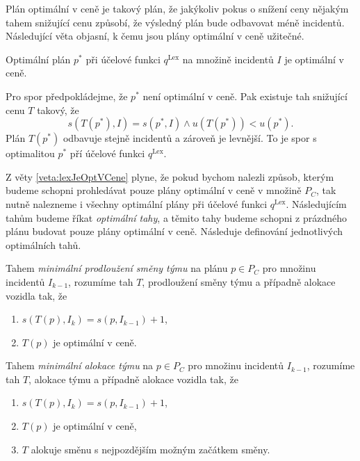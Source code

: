 Plán optimální v ceně je takový plán, že jakýkoliv pokus o snížení ceny nějakým tahem snižující cenu způsobí, že výsledný plán bude odbavovat méně incidentů.
Následující věta objasní, k čemu jsou plány optimální v ceně užitečné.
\begin{veta}\label{veta:lexJeOptVCene}
  Optimální plán $p^*$ při účelové funkci $q^{\text{Lex}}$ na množině incidentů $I$ je optimální v ceně.
\end{veta}
\begin{dukaz}
  Pro spor předpokládejme, že $p^*$ není optimální v ceně.
  Pak existuje tah snižující cenu $T$ takový, že
  \begin{equation*}
    s(T(p^*), I) = s(p^*, I) \land u(T(p^*)) < u(p^*).
  \end{equation*}
  Plán $T(p^*)$ odbavuje stejně incidentů a zároveň je levnější.
  To je spor s optimalitou $p^*$ pří účelové funkci $q^{\text{Lex}}$.
\end{dukaz}

Z věty \ref{veta:lexJeOptVCene} plyne, že pokud bychom nalezli způsob, kterým budeme schopni prohledávat pouze plány optimální v ceně v množině $P_C$, tak nutně
nalezneme i všechny optimální plány při účelové funkci $q^{\text{Lex}}$.
Následujícím tahům budeme říkat \textit{optimální tahy}, a těmito tahy budeme schopni z prázdného plánu budovat pouze plány optimální v ceně.
Následuje definování jednotlivých optimálních tahů.

\begin{definice}
  Tahem \textit{minimální prodloužení směny týmu} na plánu $p \in P_C$ pro množinu incidentů $I_{k-1}$, rozumíme tah $T$, prodloužení směny týmu a případně alokace vozidla tak, že
  \begin{enumerate}
    \item
      $s(T(p), I_{k}) = s(p, I_{k-1}) + 1$,
    \item
      $T(p)$ je optimální v ceně.
  \end{enumerate}
\end{definice}

\begin{definice}
  Tahem \textit{minimální alokace týmu} na $p \in P_C$ pro množinu incidentů $I_{k-1}$, rozumíme tah $T$, alokace týmu a případně alokace vozidla tak, že
  \begin{enumerate}
    \item
      $s(T(p), I_k) = s(p, I_{k-1}) + 1$,

    \item
      $T(p)$ je optimální v ceně,


    \item
      $T$ alokuje směnu s nejpozdějším možným začátkem směny.
  \end{enumerate}
\end{definice}


